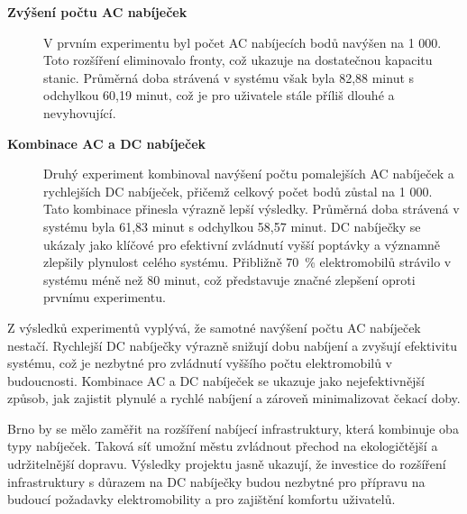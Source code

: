 \documentclass[a4paper,11pt]{article}
\begin{document}
\begin{description}
    \item[\textbf{Zvýšení počtu AC nabíječek}] V prvním experimentu byl počet AC nabíjecích bodů navýšen na 1 000. Toto rozšíření eliminovalo fronty, což ukazuje na dostatečnou kapacitu stanic. Průměrná doba strávená v systému však byla 82,88 minut s odchylkou 60,19 minut, což je pro uživatele stále příliš dlouhé a nevyhovující.
    \item[\textbf{Kombinace AC a DC nabíječek}] Druhý experiment kombinoval navýšení počtu pomalejších AC nabíječek a rychlejších DC nabíječek, přičemž celkový počet bodů zůstal na 1 000. Tato kombinace přinesla výrazně lepší výsledky. Průměrná doba strávená v systému byla 61,83 minut s odchylkou 58,57 minut. DC nabíječky se ukázaly jako klíčové pro efektivní zvládnutí vyšší poptávky a významně zlepšily plynulost celého systému. Přibližně 70~\% elektromobilů strávilo v systému méně než 80 minut, což představuje značné zlepšení oproti prvnímu experimentu.
\end{description}

Z výsledků experimentů vyplývá, že samotné navýšení počtu AC nabíječek nestačí. Rychlejší DC nabíječky výrazně snižují dobu nabíjení a zvyšují efektivitu systému, což je nezbytné pro zvládnutí vyššího počtu elektromobilů v budoucnosti. Kombinace AC a DC nabíječek se ukazuje jako nejefektivnější způsob, jak zajistit plynulé a rychlé nabíjení a zároveň minimalizovat čekací doby.

Brno by se mělo zaměřit na rozšíření nabíjecí infrastruktury, která kombinuje oba typy nabíječek. Taková síť umožní městu zvládnout přechod na ekologičtější a udržitelnější dopravu. Výsledky projektu jasně ukazují, že investice do rozšíření infrastruktury s důrazem na DC nabíječky budou nezbytné pro přípravu na budoucí požadavky elektromobility a pro zajištění komfortu uživatelů.

\newpage


\end{document}
